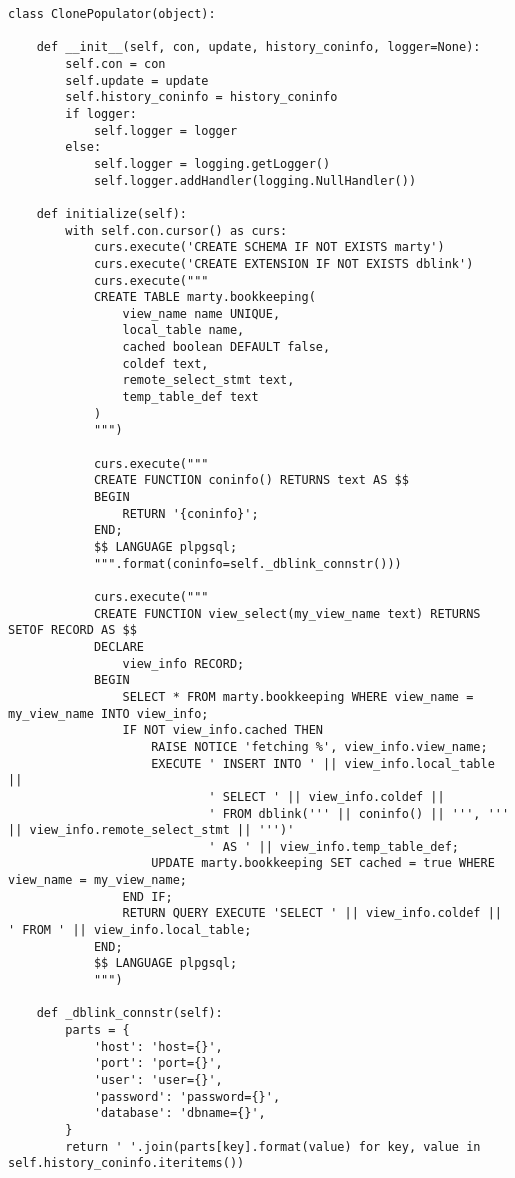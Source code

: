 \begin{lstlisting}[caption={populator.py}]
class ClonePopulator(object):

    def __init__(self, con, update, history_coninfo, logger=None):
        self.con = con
        self.update = update
        self.history_coninfo = history_coninfo
        if logger:
            self.logger = logger
        else:
            self.logger = logging.getLogger()
            self.logger.addHandler(logging.NullHandler())

    def initialize(self):
        with self.con.cursor() as curs:
            curs.execute('CREATE SCHEMA IF NOT EXISTS marty')
            curs.execute('CREATE EXTENSION IF NOT EXISTS dblink')
            curs.execute("""
            CREATE TABLE marty.bookkeeping(
                view_name name UNIQUE,
                local_table name,
                cached boolean DEFAULT false,
                coldef text,
                remote_select_stmt text,
                temp_table_def text
            )
            """)

            curs.execute("""
            CREATE FUNCTION coninfo() RETURNS text AS $$
            BEGIN
                RETURN '{coninfo}';
            END;
            $$ LANGUAGE plpgsql;
            """.format(coninfo=self._dblink_connstr()))

            curs.execute("""
            CREATE FUNCTION view_select(my_view_name text) RETURNS SETOF RECORD AS $$
            DECLARE
                view_info RECORD;
            BEGIN
                SELECT * FROM marty.bookkeeping WHERE view_name = my_view_name INTO view_info;
                IF NOT view_info.cached THEN
                    RAISE NOTICE 'fetching %', view_info.view_name;
                    EXECUTE ' INSERT INTO ' || view_info.local_table ||
                            ' SELECT ' || view_info.coldef ||
                            ' FROM dblink(''' || coninfo() || ''', ''' || view_info.remote_select_stmt || ''')'
                            ' AS ' || view_info.temp_table_def;
                    UPDATE marty.bookkeeping SET cached = true WHERE view_name = my_view_name;
                END IF;
                RETURN QUERY EXECUTE 'SELECT ' || view_info.coldef || ' FROM ' || view_info.local_table;
            END;
            $$ LANGUAGE plpgsql;
            """)

    def _dblink_connstr(self):
        parts = {
            'host': 'host={}',
            'port': 'port={}',
            'user': 'user={}',
            'password': 'password={}',
            'database': 'dbname={}',
        }
        return ' '.join(parts[key].format(value) for key, value in self.history_coninfo.iteritems())


\end{lstlisting}

